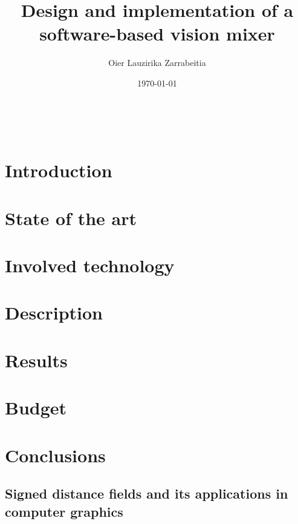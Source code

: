 \documentclass{etsist_pfg}
\title{Design and implementation of a software-based vision mixer}
\author{Oier Lauzirika Zarrabeitia}
\date{\today}
\begin{document}


\newpage
\thispagestyle{empty}
\
\newpage

\renewcommand{\abstractname}{Resumen}
\begin{abstract}
    
\end{abstract}

\renewcommand{\abstractname}{Abstract}
\begin{abstract}
    
\end{abstract}

\tableofcontents

\listoffigures

\listoftables



\chapter{Introduction}


\chapter{State of the art}


\chapter{Involved technology}


\chapter{Description}


\chapter{Results}


\chapter{Budget}


\chapter{Conclusions}


\printbibliography

\begin{appendices}
\chapter{Signed distance fields and its applications in computer graphics}


\end{appendices}
\end{document}
